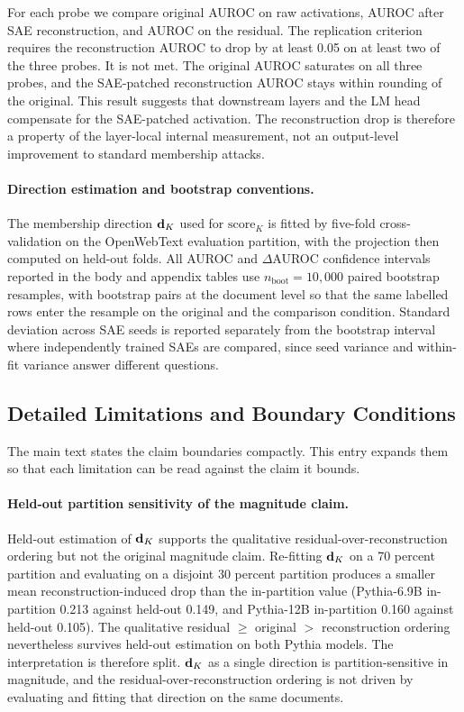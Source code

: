 For each probe we compare original AUROC on raw activations, AUROC after SAE reconstruction, and AUROC on the residual. The replication criterion requires the reconstruction AUROC to drop by at least 0.05 on at least two of the three probes. It is not met. The original AUROC saturates on all three probes, and the SAE-patched reconstruction AUROC stays within rounding of the original. This result suggests that downstream layers and the LM head compensate for the SAE-patched activation. The reconstruction drop is therefore a property of the layer-local internal measurement, not an output-level improvement to standard membership attacks.

\paragraph{Direction estimation and bootstrap conventions.}
The membership direction $\mathbf{d}_K$ used for $\mathrm{score}_K$ is fitted by five-fold cross-validation on the OpenWebText evaluation partition, with the projection then computed on held-out folds. All AUROC and $\Delta$AUROC confidence intervals reported in the body and appendix tables use $n_{\mathrm{boot}} = 10{,}000$ paired bootstrap resamples, with bootstrap pairs at the document level so that the same labelled rows enter the resample on the original and the comparison condition. Standard deviation across SAE seeds is reported separately from the bootstrap interval where independently trained SAEs are compared, since seed variance and within-fit variance answer different questions.

\subsection{Detailed Limitations and Boundary Conditions}
\label{app:limitations_detail}

The main text states the claim boundaries compactly. This entry expands them so that each limitation can be read against the claim it bounds.

\paragraph{Held-out partition sensitivity of the magnitude claim.}
Held-out estimation of $\mathbf{d}_K$ supports the qualitative residual-over-reconstruction ordering but not the original magnitude claim. Re-fitting $\mathbf{d}_K$ on a 70 percent partition and evaluating on a disjoint 30 percent partition produces a smaller mean reconstruction-induced drop than the in-partition value (Pythia-6.9B in-partition 0.213 against held-out 0.149, and Pythia-12B in-partition 0.160 against held-out 0.105). The qualitative residual $\geq$ original $>$ reconstruction ordering nevertheless survives held-out estimation on both Pythia models. The interpretation is therefore split. $\mathbf{d}_K$ as a single direction is partition-sensitive in magnitude, and the residual-over-reconstruction ordering is not driven by evaluating and fitting that direction on the same documents.

